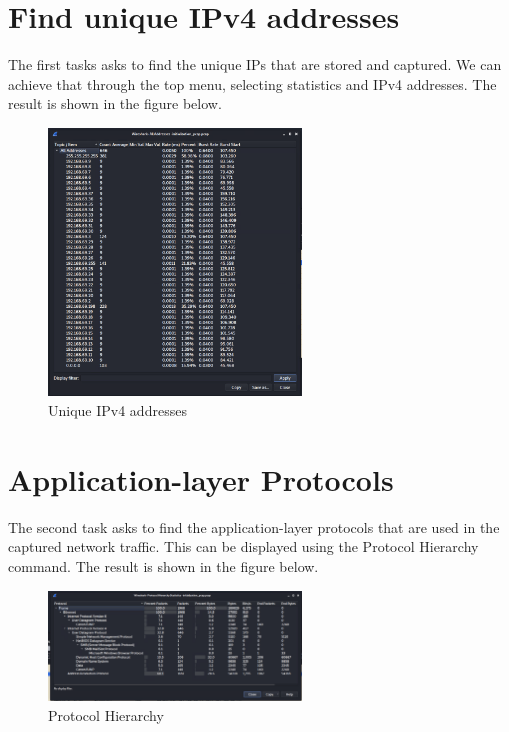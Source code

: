 \section{Find unique IPv4 addresses}
\label{s:Find-Unique-IPv4-Addresses}
The first tasks asks to find the unique IPs that are stored and captured.
We can achieve that through the top menu, selecting statistics and IPv4 addresses.
The result is shown in the figure below.
\begin{figure}[H]
  \centering
  \includegraphics[width=0.6\textwidth]{figures/unique-ipv4-addresses}
  \caption{Unique IPv4 addresses}
  \label{f:unique-ipv4-addresses}
\end{figure}

\section{Application-layer Protocols}
\label{s:Application-layer-Protocols}
The second task asks to find the application-layer protocols that are used in the
captured network traffic. This can be displayed using the Protocol Hierarchy command.
The result is shown in the figure below.
\begin{figure}[H]
  \centering
  \includegraphics[width=0.6\textwidth]{figures/protocol-hierarchy}
  \caption{Protocol Hierarchy}
  \label{f:protocol-hierarchy}
\end{figure}

